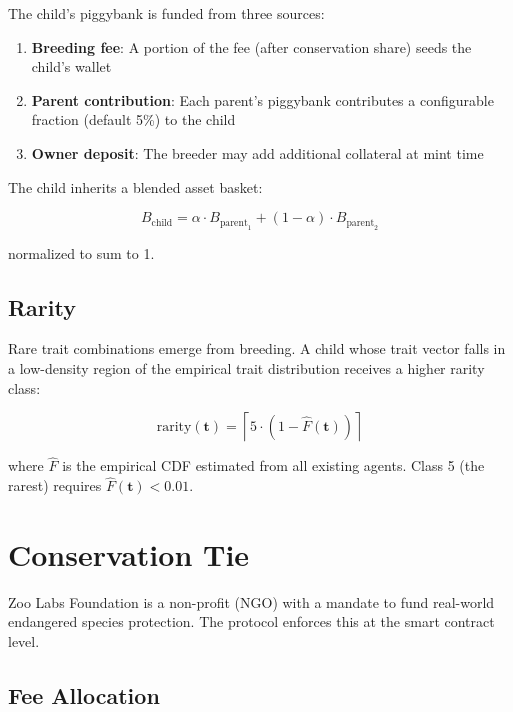\documentclass[11pt,letterpaper]{article}
\begin{document}
The child's piggybank is funded from three sources:

\begin{enumerate}
    \item \textbf{Breeding fee}: A portion of the fee (after conservation share) seeds the child's wallet
    \item \textbf{Parent contribution}: Each parent's piggybank contributes a configurable fraction (default 5\%) to the child
    \item \textbf{Owner deposit}: The breeder may add additional collateral at mint time
\end{enumerate}

The child inherits a blended asset basket:

\begin{equation}
B_{\text{child}} = \alpha \cdot B_{\text{parent}_1} + (1 - \alpha) \cdot B_{\text{parent}_2}
\end{equation}

normalized to sum to 1.

\subsection{Rarity}

Rare trait combinations emerge from breeding. A child whose trait vector falls in a low-density region of the empirical trait distribution receives a higher rarity class:

\begin{equation}
\text{rarity}(\mathbf{t}) = \left\lceil 5 \cdot \left(1 - \hat{F}(\mathbf{t})\right) \right\rceil
\end{equation}

where $\hat{F}$ is the empirical CDF estimated from all existing agents. Class 5 (the rarest) requires $\hat{F}(\mathbf{t}) < 0.01$.

\section{Conservation Tie}
\label{sec:conservation}

Zoo Labs Foundation is a non-profit (NGO) with a mandate to fund real-world endangered species protection. The protocol enforces this at the smart contract level.

\subsection{Fee Allocation}
\end{document}
